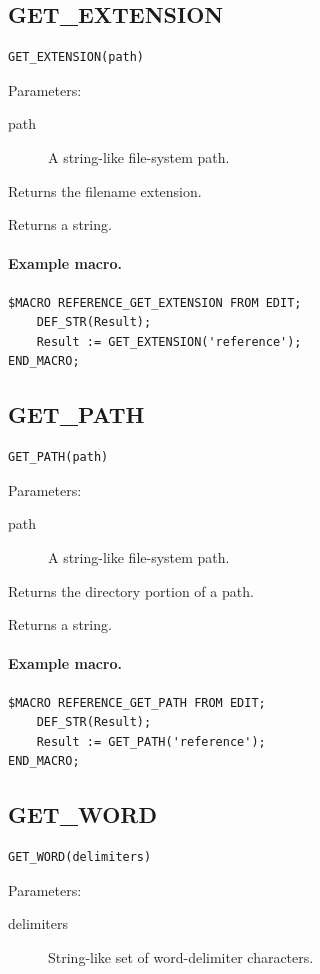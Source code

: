 \documentclass[a4paper,10pt,twoside,openany]{book}
\begin{document}
\label{prim:intrinsic-get-extension}
\subsection*{GET\_EXTENSION}
\begin{verbatim}
GET_EXTENSION(path)
\end{verbatim}
Parameters:
\begin{description}
\item[path] A string-like file-system path.
\end{description}

Returns the filename extension.

Returns a string.

\paragraph{Example macro.}
\begin{verbatim}
$MACRO REFERENCE_GET_EXTENSION FROM EDIT;
    DEF_STR(Result);
    Result := GET_EXTENSION('reference');
END_MACRO;
\end{verbatim}

\label{prim:intrinsic-get-path}
\subsection*{GET\_PATH}
\begin{verbatim}
GET_PATH(path)
\end{verbatim}
Parameters:
\begin{description}
\item[path] A string-like file-system path.
\end{description}

Returns the directory portion of a path.

Returns a string.

\paragraph{Example macro.}
\begin{verbatim}
$MACRO REFERENCE_GET_PATH FROM EDIT;
    DEF_STR(Result);
    Result := GET_PATH('reference');
END_MACRO;
\end{verbatim}

\label{prim:intrinsic-get-word}
\subsection*{GET\_WORD}
\begin{verbatim}
GET_WORD(delimiters)
\end{verbatim}
Parameters:
\begin{description}
\item[delimiters] String-like set of word-delimiter characters.
\end{description}
\end{document}
